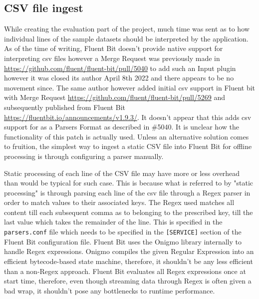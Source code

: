 \subsection{CSV file ingest}
While creating the evaluation part of the project, much time was sent as to how individual lines of the sample datasets should be interpreted by the application. As of the time of writing, Fluent Bit doesn't provide native support for interpreting \acrshort{csv} files however a Merge Request was previously made in \href{#5040}{https://github.com/fluent/fluent-bit/pull/5040} to add such an Input plugin however it was closed its author April 8th 2022 and there appears to be no movement since. The same author however added initial \acrshort{csv} support in Fluent bit with Merge Request \href{#5269}{https://github.com/fluent/fluent-bit/pull/5269} and subsequently published from Fluent Bit \href{v1.9.3}{https://fluentbit.io/announcements/v1.9.3/}. It doesn't appear that this adds \acrshort{csv} support for as a Parsers Format as described in \#5040. It is unclear how the functionality of this patch is actually used. Unless an alternative solution comes to fruition, the simplest way to ingest a static CSV file into Fluent Bit for offline processing is through configuring a parser manually.

Static processing of each line of the CSV file may have more or less overhead than would be typical for such case. This is because what is referred to by "static processing" is through parsing each line of the csv file through a Regex parser in order to match values to their associated keys. The Regex used matches all content till each subsequent comma as to belonging to the prescribed key, till the last value which takes the remainder of the line. This is specified in the \texttt{parsers.conf} file which needs to be specified in the \texttt{[SERVICE]} section of the Fluent Bit configuration file. Fluent Bit uses the Onigmo library internally to handle Regex expressions. Onigmo compiles the given Regular Expression into an efficient bytecode-based state machine\cite{Hess_2023}, therefore, it shouldn't be any less efficient than a non-Regex approach. Fluent Bit evaluates all Regex expressions once at start time, therefore, even though streaming data through Regex is often given a bad wrap, it shouldn't pose any bottlenecks to runtime performance.


